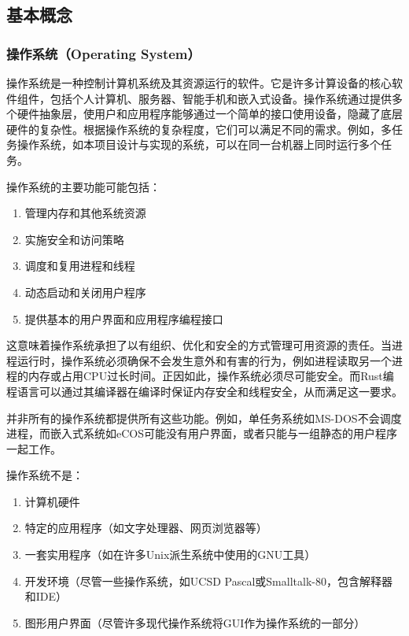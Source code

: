 \subsection{基本概念}

\subsubsection{操作系统（Operating System）}

操作系统是一种控制计算机系统及其资源运行的软件。它是许多计算设备的核心软件组件，包括个人计算机、服务器、智能手机和嵌入式设备。操作系统通过提供多个硬件抽象层，使用户和应用程序能够通过一个简单的接口使用设备，隐藏了底层硬件的复杂性。根据操作系统的复杂程度，它们可以满足不同的需求。例如，多任务操作系统，如本项目设计与实现的系统，可以在同一台机器上同时运行多个任务。

操作系统的主要功能可能包括：

\begin{enumerate}
    \item 管理内存和其他系统资源
    \item 实施安全和访问策略
    \item 调度和复用进程和线程
    \item 动态启动和关闭用户程序
    \item 提供基本的用户界面和应用程序编程接口
\end{enumerate}

这意味着操作系统承担了以有组织、优化和安全的方式管理可用资源的责任。当进程运行时，操作系统必须确保不会发生意外和有害的行为，例如进程读取另一个进程的内存或占用CPU过长时间。正因如此，操作系统必须尽可能安全。而Rust编程语言可以通过其编译器在编译时保证内存安全和线程安全，从而满足这一要求。

并非所有的操作系统都提供所有这些功能。例如，单任务系统如MS-DOS不会调度进程，而嵌入式系统如eCOS可能没有用户界面，或者只能与一组静态的用户程序一起工作。

操作系统不是：

\begin{enumerate}
    \item 计算机硬件
    \item 特定的应用程序（如文字处理器、网页浏览器等）
    \item 一套实用程序（如在许多Unix派生系统中使用的GNU工具）
    \item 开发环境（尽管一些操作系统，如UCSD Pascal或Smalltalk-80，包含解释器和IDE）
    \item 图形用户界面（尽管许多现代操作系统将GUI作为操作系统的一部分）
\end{enumerate}

